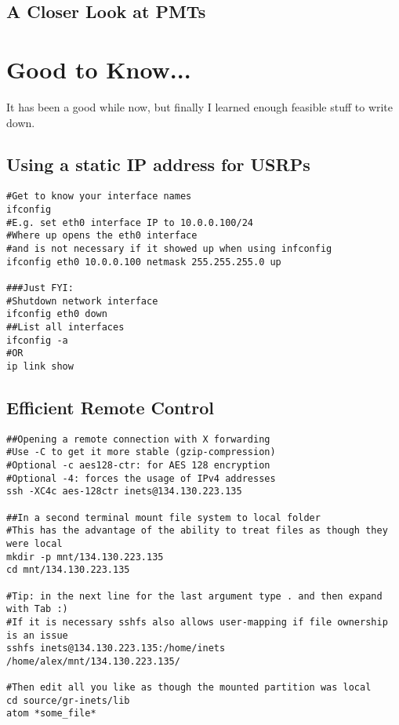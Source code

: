 \documentclass{article}
\begin{document}
\subsection{A Closer Look at PMTs}

\section{Good to Know...}

It has been a good while now, but finally I learned enough feasible stuff to write down.

\subsection{Using a static IP address for USRPs}
\begin{verbatim}
#Get to know your interface names
ifconfig 
#E.g. set eth0 interface IP to 10.0.0.100/24
#Where up opens the eth0 interface 
#and is not necessary if it showed up when using infconfig
ifconfig eth0 10.0.0.100 netmask 255.255.255.0 up

###Just FYI:
#Shutdown network interface
ifconfig eth0 down
##List all interfaces
ifconfig -a
#OR
ip link show
\end{verbatim}

\subsection{Efficient Remote Control}

\begin{verbatim}
##Opening a remote connection with X forwarding
#Use -C to get it more stable (gzip-compression)
#Optional -c aes128-ctr: for AES 128 encryption
#Optional -4: forces the usage of IPv4 addresses
ssh -XC4c aes-128ctr inets@134.130.223.135

##In a second terminal mount file system to local folder
#This has the advantage of the ability to treat files as though they were local
mkdir -p mnt/134.130.223.135
cd mnt/134.130.223.135

#Tip: in the next line for the last argument type . and then expand with Tab :)
#If it is necessary sshfs also allows user-mapping if file ownership is an issue
sshfs inets@134.130.223.135:/home/inets /home/alex/mnt/134.130.223.135/

#Then edit all you like as though the mounted partition was local
cd source/gr-inets/lib
atom *some_file*

\end{verbatim}
\end{document}
